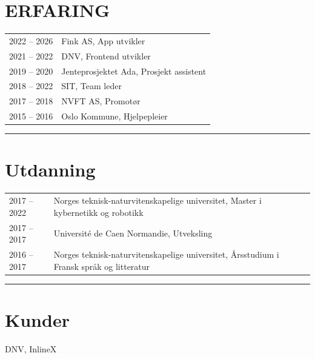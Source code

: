 \documentclass[a4paper,11pt]{article}
\begin{document}
\begin{paracol}{2}
\switchcolumn

\vspace{5em}
\begin{center}
    
\end{center}
\vspace{2em}

 
\section{\ubuntu ERFARING}
\renewcommand{\arraystretch}{1.3} %
\begin{tabularx}{\columnwidth}{@{}lX@{}}
2022 -- 2026 & Fink AS, App utvikler \\
2021 -- 2022 & DNV, Frontend utvikler \\
2019 -- 2020 & Jenteprosjektet Ada, Prosjekt assistent \\
2018 -- 2022 & SIT, Team leder \\
2017 -- 2018 & NVFT AS, Promotør \\
2015 -- 2016 & Oslo Kommune, Hjelpepleier \\
\end{tabularx}

\vspace{0.5em} 
\noindent\rule{\linewidth}{0.2pt}

\section{\ubuntu Utdanning}
\renewcommand{\arraystretch}{1.3} %
\begin{tabularx}{\columnwidth}{@{}l>{\raggedright\arraybackslash}X@{}}
2017 -- 2022 & Norges teknisk-naturvitenskapelige universitet, Master i kybernetikk og robotikk \\
2017 -- 2017 & Université de Caen Normandie, Utveksling \\
2016 -- 2017 & Norges teknisk-naturvitenskapelige universitet, Årsstudium i Fransk språk og litteratur \\
\end{tabularx}

\vspace{0.5em} 
\noindent\rule{\linewidth}{0.2pt}


\section{\ubuntu Kunder}
DNV, \hspace{0.1em} 
InlineX


\end{paracol}
\end{document}
